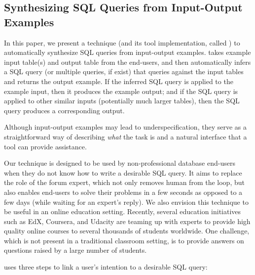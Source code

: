 \subsection{Synthesizing SQL Queries from Input-Output Examples}


In this paper, we present a technique (and its tool
implementation, called \ourtool) to automatically synthesize SQL queries
from input-output examples. \ourtool takes example input
table(s) and output table from the end-users, and then automatically
infers a SQL query (or multiple queries, if exist) that queries
against the input tables and returns the output example. If the inferred
SQL query is applied
to the example input, then it produces the example output; and if the
SQL query is applied to other similar inputs (potentially much larger tables),
then the SQL query produces a corresponding output.

Although
input-output examples may lead to underspecification, they
serve as a straightforward way of describing \textit{what} the
task is and a natural interface that a tool can provide assistance.

Our technique is designed to be used by non-professional 
database end-users when they do not know how to write a desirable SQL query.
It aims to replace the role of the forum expert, 
which not only removes human from the loop, but also enables
end-users to solve their problems in a few seconds as opposed to a few days
(while waiting for an expert's reply). 
We also envision this technique to be useful in an online education
setting. Recently, several education initiatives such as EdX, Coursera,
and Udacity are teaming up with experts to provide high quality online courses
to several thousands of students worldwide.
One challenge, which is not present in a traditional classroom
setting, is to provide answers on questions raised by a large
number of students.





\ourtool uses three steps to link a user's intention to
a desirable SQL query:


